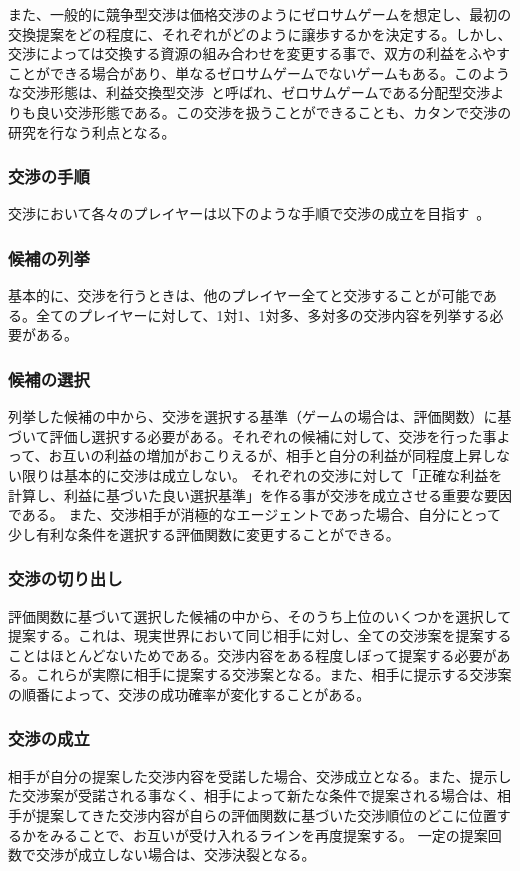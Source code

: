 \documentclass[a4, 10pt,dvipdfmx]{jsarticle}
\begin{document}
また、一般的に競争型交渉は価格交渉のようにゼロサムゲームを想定し、最初の交換提案をどの程度に、それぞれがどのように譲歩するかを決定する。しかし、交渉によっては交換する資源の組み合わせを変更する事で、双方の利益をふやすことができる場合があり、単なるゼロサムゲームでないゲームもある。このような交渉形態は、利益交換型交渉~\cite{開発2009kobe}と呼ばれ、ゼロサムゲームである分配型交渉よりも良い交渉形態である。この交渉を扱うことができることも、カタンで交渉の研究を行なう利点となる。

\subsubsection{交渉の手順}
交渉において各々のプレイヤーは以下のような手順で交渉の成立を目指す~\cite{安村禎明2002モノポリーゲームにおける交渉エージェント}。
\subsubsection*{候補の列挙}
基本的に、交渉を行うときは、他のプレイヤー全てと交渉することが可能である。全てのプレイヤーに対して、1対1、1対多、多対多の交渉内容を列挙する必要がある。

\subsubsection*{候補の選択}
列挙した候補の中から、交渉を選択する基準（ゲームの場合は、評価関数）に基づいて評価し選択する必要がある。それぞれの候補に対して、交渉を行った事よって、お互いの利益の増加がおこりえるが、相手と自分の利益が同程度上昇しない限りは基本的に交渉は成立しない。
それぞれの交渉に対して「正確な利益を計算し、利益に基づいた良い選択基準」を作る事が交渉を成立させる重要な要因である。
また、交渉相手が消極的なエージェントであった場合、自分にとって少し有利な条件を選択する評価関数に変更することができる。

\subsubsection*{交渉の切り出し}
評価関数に基づいて選択した候補の中から、そのうち上位のいくつかを選択して提案する。これは、現実世界において同じ相手に対し、全ての交渉案を提案することはほとんどないためである。交渉内容をある程度しぼって提案する必要がある。これらが実際に相手に提案する交渉案となる。また、相手に提示する交渉案の順番によって、交渉の成功確率が変化することがある。

\subsubsection*{交渉の成立}
相手が自分の提案した交渉内容を受諾した場合、交渉成立となる。また、提示した交渉案が受諾される事なく、相手によって新たな条件で提案される場合は、相手が提案してきた交渉内容が自らの評価関数に基づいた交渉順位のどこに位置するかをみることで、お互いが受け入れるラインを再度提案する。
一定の提案回数で交渉が成立しない場合は、交渉決裂となる。
\end{document}

